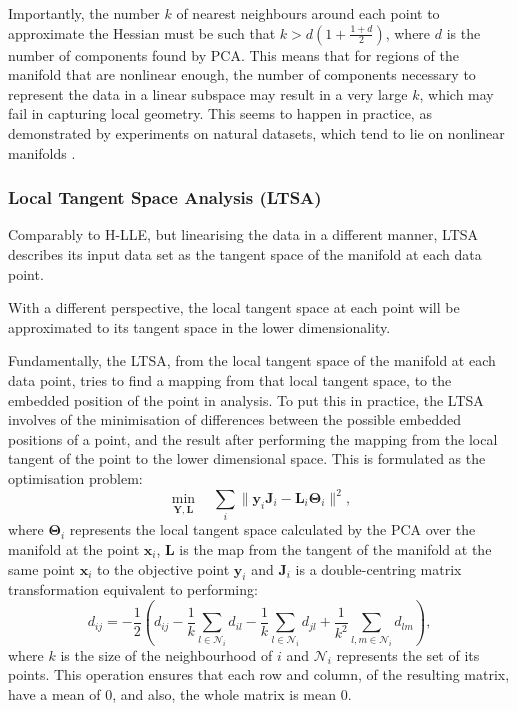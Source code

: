         Importantly, the number $k$ of nearest neighbours around each point to approximate the Hessian must be such that $k > d (1 + \frac{1 + d}{2})$, where $d$ is the number of components found by PCA. This means that for regions of the manifold that are nonlinear enough, the number of components necessary to represent the data in a linear subspace may result in a very large $k$, which may fail in capturing local geometry. This seems to happen in practice, as demonstrated by experiments on natural datasets, which tend to lie on nonlinear manifolds \cite{h-lle}.
    
    \subsubsection{Local Tangent Space Analysis (LTSA)}
        Comparably to H-LLE, but linearising the data in a different manner, LTSA \cite{ltsa} describes its input data set as the tangent space of the manifold at each data point.
        
        With a different perspective, the local tangent space at each point will be approximated to its tangent space in the lower dimensionality.
        
        Fundamentally, the LTSA, from the local tangent space of the manifold at each data point, tries to find a mapping from that local tangent space, to the embedded position of the point in analysis.
        To put this in practice, the LTSA involves of the minimisation of differences between the possible embedded positions of a point, and the result after performing the mapping from the local tangent of the point to the lower dimensional space. This is formulated as the optimisation problem: 
        \begin{equation}
            \min_{\bm{Y},\bm{L}} \quad \sum_i \| \bm{y}_i \bm{J}_i - \bm{L}_i \bm{\Theta}_i \|^2,
        \end{equation}
        where $\bm{\Theta}_i$ represents the local tangent space calculated by the PCA over the manifold at the point $\bm{x}_i$, $\bm{L}$ is the map from the tangent of the manifold at the same point $\bm{x}_i$ to the objective point $\bm{y}_i$ and $\bm{J}_i$ is a double-centring matrix transformation equivalent to performing:
        \begin{equation}
            d_{ij} = -\frac{1}{2} \left( d_{ij} - \frac{1}{k} \sum_{l \in \mathcal{N}_i} d_{il} - \frac{1}{k} \sum_{l \in \mathcal{N}_i} d_{jl} + \frac{1}{k^2}\sum_{l,m \in \mathcal{N}_i} d_{lm} \right),
            \label{double centre}
        \end{equation}
        where $k$ is the size of the neighbourhood of $i$ and $\mathcal{N}_i$ represents the set of its points. This operation ensures that each row and column, of the resulting matrix, have a mean of $0$, and also, the whole matrix is mean $0$.
    
